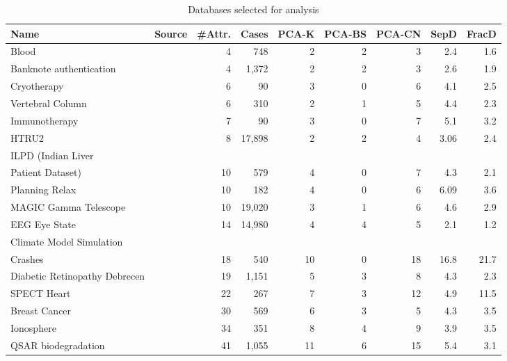 \documentclass[entropy,article,submit,moreauthors,pdftex]{Definitions/mdpi}
\begin{document}
\begin{table}[tb]
\caption{Databases selected for analysis}
\centering
\tablesize{\footnotesize} %
\begin{tabular}{lcrrrrrrr}
\toprule
\textbf{Name}& \textbf{Source}&\textbf{\#Attr.}&\textbf{Cases}&\textbf{PCA-K}&\textbf{PCA-BS}&\textbf{PCA-CN}&\textbf{SepD}&\textbf{FracD}\\
\hline
Blood & \cite{bloodDB} & 4 & 748 & 2 & 2 & 3 & 2.4 & 1.6\\ \hline
Banknote authentication & \cite{banknoteDB} & 4 & 1,372 & 2 & 2 & 3 & 2.6 & 1.9\\ \hline
Cryotherapy & \cite{khozeimeh2017, khozeimeh2017a, CryotherapyDB} & 6 & 90 & 3 & 0 & 6 & 4.1 & 2.5\\ \hline
Vertebral Column & \cite{VertebralDB} & 6 & 310 & 2 & 1 & 5 & 4.4 & 2.3\\ \hline
Immunotherapy & \cite{khozeimeh2017, khozeimeh2017a, ImmunotherapyDB} & 7 & 90 & 3 & 0 & 7 & 5.1 & 3.2\\ \hline
HTRU2 & \cite{HTRU2BD, HTRU2BD2, lyon2016} & 8 & 17,898 & 2 & 2 & 4 & 3.06 & 2.4\\ \hline
ILPD (Indian Liver &&&&&&&&\\
Patient Dataset) & \cite{ILDPDB} & 10 & 579 & 4 & 0 & 7 & 4.3 & 2.1\\ \hline
Planning Relax & \cite{RelaxDB} & 10 & 182 & 4 & 0 & 6 & 6.09 & 3.6\\ \hline
MAGIC Gamma Telescope & \cite{TelescopeDB} & 10 & 19,020 & 3 & 1 & 6 & 4.6 & 2.9\\ \hline
EEG Eye State & \cite{EEGDB} & 14 & 14,980 & 4 & 4 & 5 & 2.1 & 1.2\\ \hline
Climate Model Simulation &&&&&&&&\\
Crashes & \cite{ClimateDB} & 18 & 540 & 10 & 0 & 18 & 16.8 & 21.7\\ \hline
Diabetic Retinopathy Debrecen & \cite{DiabeticDB, antal2014} & 19 & 1,151 & 5 & 3 & 8 & 4.3 & 2.3\\ \hline
SPECT Heart & \cite{HeartDB} & 22 & 267 & 7 & 3 & 12 & 4.9 & 11.5\\ \hline
Breast Cancer  & \cite{BreastDB} & 30 & 569 & 6 & 3 & 5 & 4.3 & 3.5\\ \hline
Ionosphere & \cite{IonosphereDB} & 34 & 351 & 8 & 4 & 9 & 3.9 & 3.5\\ \hline
QSAR biodegradation & \cite{mansouri2013, QSARDB} & 41 & 1,055 & 11 & 6 & 15 & 5.4 & 3.1\\ \hline

\end{tabular}
\end{table}
\end{document}
